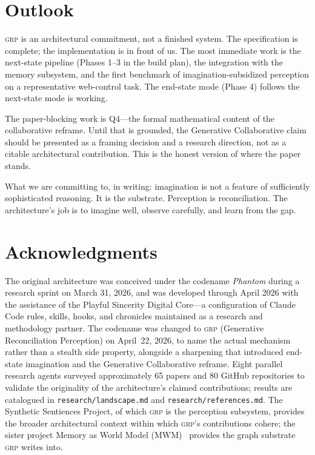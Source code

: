 \documentclass[12pt]{article}
\theoremstyle{definition}
\theoremstyle{remark}
\newcommand{\grp}{\textsc{grp}}
\begin{document}
\section{Outlook}
\label{sec:outlook}

\grp{} is an architectural commitment, not a finished system. The
specification is complete; the implementation is in front of us. The
most immediate work is the next-state pipeline (Phases 1--3 in the
build plan), the integration with the memory subsystem, and the
first benchmark of imagination-subsidized perception on a
representative web-control task. The end-state mode (Phase 4) follows
the next-state mode is working.

The paper-blocking work is Q4---the formal mathematical content of
the collaborative reframe. Until that is grounded, the Generative
Collaborative claim should be presented as a framing decision and a
research direction, not as a citable architectural contribution. This
is the honest version of where the paper stands.

What we are committing to, in writing: imagination is not a feature
of sufficiently sophisticated reasoning. It is the substrate.
Perception is reconciliation. The architecture's job is to imagine
well, observe carefully, and learn from the gap.

\section*{Acknowledgments}
\label{sec:acknowledgments}

The original architecture was conceived under the codename
\emph{Phantom} during a research sprint on March 31, 2026, and was
developed through April 2026 with the assistance of the Playful
Sincerity Digital Core---a configuration of Claude Code rules,
skills, hooks, and chronicles maintained as a research and methodology
partner. The codename was changed to \grp{} (Generative Reconciliation
Perception) on April~22, 2026, to name the actual mechanism rather
than a stealth side property, alongside a sharpening that introduced
end-state imagination and the Generative Collaborative reframe. Eight
parallel research agents surveyed approximately 65 papers and 80
GitHub repositories to validate the originality of the architecture's
claimed contributions; results are catalogued in
\texttt{research/landscape.md} and \texttt{research/references.md}.
The Synthetic Sentiences Project, of which \grp{} is the perception
subsystem, provides the broader architectural context within which
\grp{}'s contributions cohere; the sister project Memory as World
Model (MWM)~\cite{mwm} provides the graph substrate \grp{} writes into.
\end{document}
